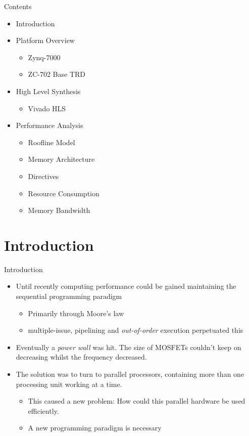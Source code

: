 \documentclass{beamer}
\begin{document}
\begin{frame}{Contents}
  \begin{itemize}
  \item Introduction
  \item Platform Overview
    \begin{itemize}
    \item Zynq-7000
    \item ZC-702 Base TRD
    \end{itemize}
  \item High Level Synthesis
    \begin{itemize}
    \item Vivado HLS
    \end{itemize}
  \item Performance Analysis
    \begin{itemize}
    \item Roofline Model
    \item Memory Architecture
    \item Directives
    \item Resource Consumption
    \item Memory Bandwidth
    \end{itemize}
  \end{itemize}
\end{frame}

\section{Introduction}

\begin{frame}{Introduction}
  \begin{itemize}
  \item Until recently computing performance could be gained
    maintaining the sequential programming paradigm
    \begin{itemize}
    \item Primarily through Moore's law
    \item multiple-issue, pipelining and \emph{out-of-order} execution
      perpetuated this
    \end{itemize}
  \item Eventually a \emph{power wall} was hit. The size of MOSFETs
    couldn't keep on decreasing whilst the frequency decreased.
  \item The solution was to turn to parallel processors, containing
    more than one processing unit working at a time.
    \begin{itemize}
    \item This caused a new problem: How could this parallel hardware
      be used efficiently.
    \item A new programming paradigm is necessary
    \end{itemize}
  \end{itemize}
\end{frame}
\end{document}
